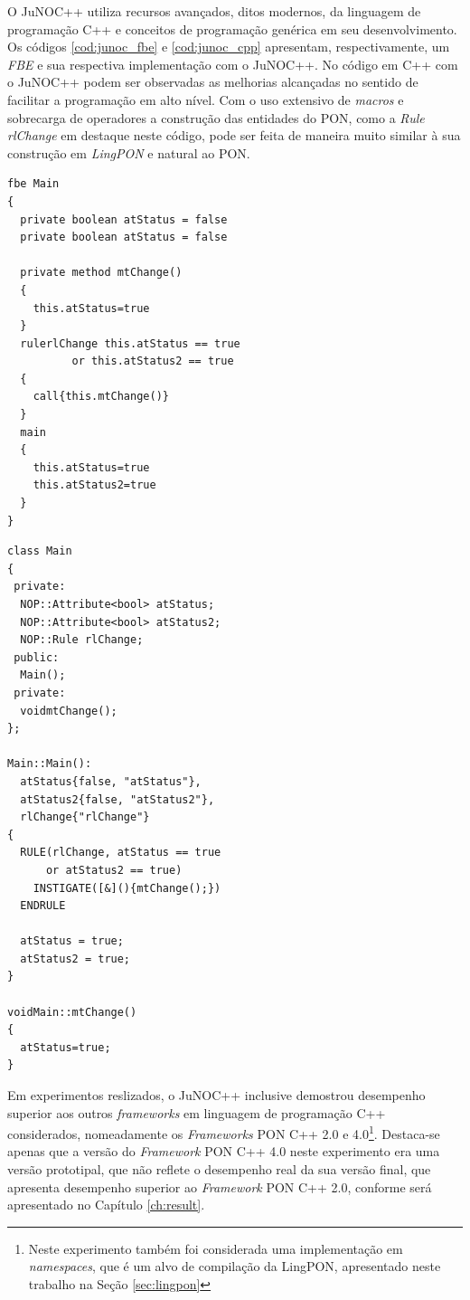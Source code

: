 O JuNOC++ utiliza recursos avançados, ditos modernos, da linguagem de
programação C++ e conceitos de programação genérica em seu desenvolvimento. Os
códigos \ref{cod:junoc_fbe} e \ref{cod:junoc_cpp} apresentam, respectivamente,
um \textit{FBE} e sua respectiva implementação com o JuNOC++. No código em C++
com o JuNOC++ podem ser observadas as melhorias alcançadas no sentido de
facilitar a programação em alto nível. Com o uso extensivo de \textit{macros} e
sobrecarga de operadores a construção das entidades do PON, como a \textit{Rule}
\textit{rlChange} em destaque neste código, pode ser feita de maneira muito
similar à sua construção em \textit{LingPON} e natural ao PON.

\noindent
\begin{minipage}{.45\textwidth}
  \begin{lstlisting}[caption = {\textit{FBE} para exemplo no JuNOC++},
    source = {\citeonline{chierichi_2020}},
    label = {cod:junoc_fbe}]
fbe Main
{
  private boolean atStatus = false
  private boolean atStatus = false

  private method mtChange()
  {
    this.atStatus=true
  }
  rulerlChange this.atStatus == true
          or this.atStatus2 == true
  {
    call{this.mtChange()}
  }
  main
  {
    this.atStatus=true
    this.atStatus2=true
  }
}
    \end{lstlisting}
\end{minipage}\hfill
\begin{minipage}{.45\textwidth}
  \begin{lstlisting}[caption = {Código em C++ para exemplo no JuNOC++},
    source = {\citeonline{chierichi_2020}},
    label = {cod:junoc_cpp}]
class Main
{
 private:
  NOP::Attribute<bool> atStatus;
  NOP::Attribute<bool> atStatus2;
  NOP::Rule rlChange;
 public:
  Main();
 private:
  voidmtChange();
};

Main::Main():
  atStatus{false, "atStatus"},
  atStatus2{false, "atStatus2"},
  rlChange{"rlChange"}
{
  RULE(rlChange, atStatus == true
      or atStatus2 == true)
    INSTIGATE([&](){mtChange();})
  ENDRULE

  atStatus = true;
  atStatus2 = true;
}

voidMain::mtChange()
{
  atStatus=true;
}

  \end{lstlisting}
\end{minipage}

Em experimentos reslizados, o JuNOC++ inclusive demostrou desempenho superior
aos outros \textit{frameworks} em linguagem de programação C++ considerados,
nomeadamente os \textit{Frameworks} PON C++ 2.0 e 4.0\footnote{Neste experimento
também foi considerada uma implementação em \textit{namespaces}, que é um alvo
de compilação da LingPON, apresentado neste trabalho na Seção
\ref{sec:lingpon}}. Destaca-se apenas que a versão do \textit{Framework} PON C++
4.0 neste experimento era uma versão prototipal, que não reflete o desempenho
real da sua versão final, que apresenta desempenho superior ao
\textit{Framework} PON C++ 2.0, conforme será apresentado no Capítulo
\ref{ch:result}.

